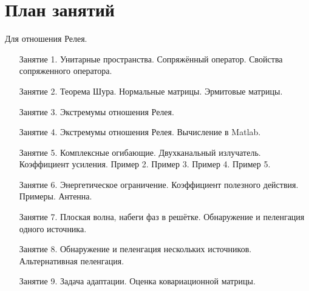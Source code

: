 \chapter{План занятий}

Для отношения Релея.
\begin{itemize}
    \item[Занятие 1.] Унитарные пространства. Сопряжённый оператор. Свойства сопряженного оператора.
    \item[Занятие 2.] Теорема Шура. Нормальные матрицы. Эрмитовые матрицы.
    \item[Занятие 3.] Экстремумы отношения Релея.
    \item[Занятие 4.] Экстремумы отношения Релея. Вычисление в Matlab.
    \item[Занятие 5.] Комплексные огибающие. Двухканальный излучатель. Коэффициент усиления. Пример 2. Пример 3. Пример 4. Пример 5.
    \item[Занятие 6.] Энергетическое ограничение. Коэффициент полезного действия. Примеры. Антенна.
    \item[Занятие 7.] Плоская волна, набеги фаз в решётке. Обнаружение и пеленгация одного источника.
    \item[Занятие 8.] Обнаружение и пеленгация нескольких источников. Альтернативная пеленгация.
    \item[Занятие 9.] Задача адаптации. Оценка ковариационной матрицы.
\end{itemize}